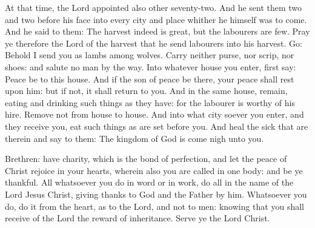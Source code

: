 \label{Go.stmark}

At that time, the Lord appointed also other seventy-two.
And he sent them two and two before his face into every city and place
whither he himself was to come.
And he said to them: The harvest indeed is great, but the
labourers are few. Pray ye therefore the Lord of the harvest that he
send labourers into his harvest.
Go: Behold I send you as lambs among wolves.
Carry neither purse, nor scrip, nor shoes: and salute no man by
the way.
Into whatever house you enter, first say: Peace be to this house.
And if the son of peace be there, your peace shall rest upon him:
but if not, it shall return to you.
And in the same house, remain, eating and drinking such things as
they have: for the labourer is worthy of his hire.  Remove not from
house to house.
And into what city soever you enter, and they receive you, eat
such things as are set before you.
And heal the sick that are therein and say to them: The kingdom of
God is come nigh unto you.


\bigskip





Brethren: have charity, which is the bond of
perfection,
and let the peace of Christ rejoice in your hearts, wherein also
you are called in one body: and be ye thankful.
All whatsoever you do in word or in work, do all in the name of
the Lord Jesus Christ, giving thanks to God and the Father by him.
Whatsoever you do, do it from the heart, as to the Lord, and not
to men:
knowing that you shall receive of the Lord the reward of
inheritance. Serve ye the Lord Christ.




